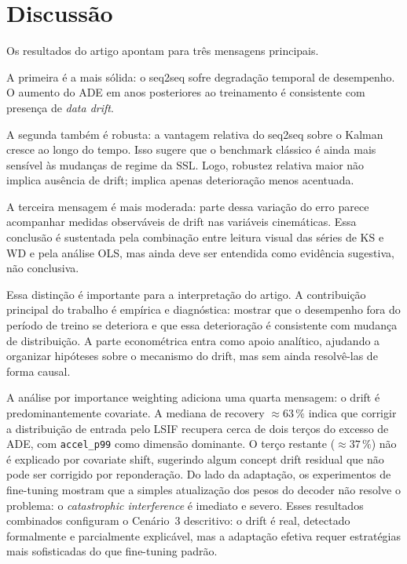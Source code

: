 \documentclass[runningheads]{llncs}
\begin{document}
\section{Discuss\~ao}
Os resultados do artigo apontam para tr\^es mensagens principais.

A primeira \'e a mais s\'olida: o seq2seq sofre degrada\c{c}\~ao temporal de desempenho. O aumento do ADE em anos posteriores ao treinamento \'e consistente com presen\c{c}a de \textit{data drift}.

A segunda tamb\'em \'e robusta: a vantagem relativa do seq2seq sobre o Kalman cresce ao longo do tempo. Isso sugere que o benchmark cl\'assico \'e ainda mais sens\'ivel \`as mudan\c{c}as de regime da SSL. Logo, robustez relativa maior n\~ao implica aus\^encia de drift; implica apenas deteriora\c{c}\~ao menos acentuada.

A terceira mensagem \'e mais moderada: parte dessa varia\c{c}\~ao do erro parece acompanhar medidas observ\'aveis de drift nas vari\'aveis cinem\'aticas. Essa conclus\~ao \'e sustentada pela combina\c{c}\~ao entre leitura visual das s\'eries de KS e WD e pela an\'alise OLS, mas ainda deve ser entendida como evid\^encia sugestiva, n\~ao conclusiva.

Essa distin\c{c}\~ao \'e importante para a interpreta\c{c}\~ao do artigo. A contribui\c{c}\~ao principal do trabalho \'e emp\'irica e diagn\'ostica: mostrar que o desempenho fora do per\'iodo de treino se deteriora e que essa deteriora\c{c}\~ao \'e consistente com mudan\c{c}a de distribui\c{c}\~ao. A parte econom\'etrica entra como apoio anal\'itico, ajudando a organizar hip\'oteses sobre o mecanismo do drift, mas sem ainda resolv\^e-las de forma causal.

A an\'alise por importance weighting adiciona uma quarta mensagem: o drift \'e predominantemente covariate. A mediana de recovery $\approx 63\,\%$ indica que corrigir a distribui\c{c}\~ao de entrada pelo LSIF recupera cerca de dois ter\c{c}os do excesso de ADE, com \texttt{accel\_p99} como dimens\~ao dominante. O ter\c{c}o restante ($\approx 37\,\%$) n\~ao \'e explicado por covariate shift, sugerindo algum concept drift residual que n\~ao pode ser corrigido por repondera\c{c}\~ao. Do lado da adapta\c{c}\~ao, os experimentos de fine-tuning mostram que a simples atualiza\c{c}\~ao dos pesos do decoder n\~ao resolve o problema: o \emph{catastrophic interference} \'e imediato e severo. Esses resultados combinados configuram o Cen\'ario~3 descritivo: o drift \'e real, detectado formalmente e parcialmente explic\'avel, mas a adapta\c{c}\~ao efetiva requer estrat\'egias mais sofisticadas do que fine-tuning padr\~ao.
\end{document}
